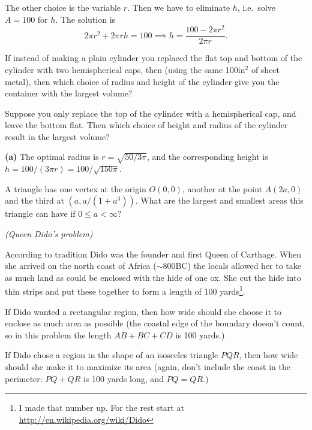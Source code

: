 \begin{multicols}{2}
The other choice is the variable $r$.  Then we have to eliminate $h$,
i.e.~solve $A=100$ for $h$.  The solution is
\[
2\pi r^2 + 2\pi rh = 100 \implies
h = \frac{100 - 2\pi r^2} {2\pi r}.
\]




\endanswer




\subprob If instead of making a plain cylinder you replaced the
flat top and bottom of the cylinder with two hemispherical caps, then
(using the same 100in$^2$ of sheet metal), then which choice of
radius and height of the cylinder give you the container with the
largest volume?




\subprob Suppose you only replace the top of the cylinder with a
hemispherical cap, and leave the bottom flat.  Then which choice of height
and radius of the cylinder result in the largest volume?




\answer %
\textbf{(a)} The optimal radius is $r = \sqrt{50/3\pi}$, and the corresponding
height is $h = 100/(3\pi r) = 100/\sqrt{150\pi}$.
\endanswer





\problem A triangle has one vertex at the origin $O(0,0)$, another at the %
point $A(2a,0)$ and the third at $(a, a/(1+a^3))$.  What are the largest
and smallest areas this triangle can have if $0\leq a<\infty$?

\problem \groupproblem \textit{(Queen Dido's problem)} %

According to tradition Dido was the founder and first Queen of
Carthage.  When she arrived on the north coast of Africa
($\sim$800BC) the locals allowed her to take as much land as could be
enclosed with the hide of one ox.  She cut the hide into thin strips
and put these together to form a length of 100 yards\footnote{I made
that number up.  For the rest start at
\url{http://en.wikipedia.org/wiki/Dido}}.



\subprob \rule{0pt}{14pt} If Dido wanted a rectangular region,
then how wide should she choose it to enclose as much area as
possible (the coastal edge of the boundary doesn't count, so in this
problem the length $AB+BC+CD$ is 100 yards.)

\subprob If Dido chose a region in the shape of an isosceles
triangle $PQR$, then how wide should she make it to maximize its area
(again, don't include the coast in the perimeter: $PQ+QR$ is 100
yards long, and $PQ=QR$.)



\end{multicols}
